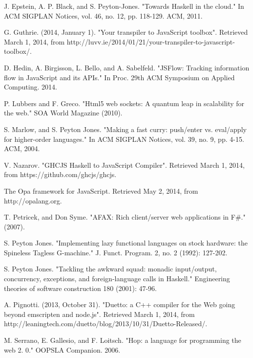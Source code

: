 \documentclass[preprint]{sigplanconf}
\begin{document}
\begin{thebibliography}{}
J. Epstein, A. P. Black, and S. Peyton-Jones. "Towards Haskell in the cloud." In ACM SIGPLAN Notices, vol. 46, no. 12, pp. 118-129. ACM, 2011.

G. Guthrie. (2014, January 1). "Your transpiler to JavaScript toolbox". Retrieved March 1, 2014, from http://luvv.ie/2014/01/21/your-transpiler-to-javascript-toolbox/.

D. Hedin, A. Birgisson, L. Bello, and A. Sabelfeld. "JSFlow: Tracking information flow in JavaScript and its APIs." In Proc. 29th ACM Symposium on Applied Computing. 2014.

P. Lubbers and F. Greco. "Html5 web sockets: A quantum leap in scalability for the web." SOA World Magazine (2010).

S. Marlow, and S. Peyton Jones. "Making a fast curry: push/enter vs. eval/apply for higher-order languages." In ACM SIGPLAN Notices, vol. 39, no. 9, pp. 4-15. ACM, 2004.

V. Nazarov. "GHCJS Haskell to JavaScript Compiler". Retrieved March 1, 2014, from https://github.com/ghcjs/ghcjs.

The Opa framework for JavaScript. Retrieved May 2, 2014, from http://opalang.org.

T. Petricek, and Don Syme. "AFAX: Rich client/server web applications in F\#." (2007).

S. Peyton Jones. "Implementing lazy functional languages on stock hardware: the Spineless Tagless G-machine." J. Funct. Program. 2, no. 2 (1992): 127-202.

S. Peyton Jones. "Tackling the awkward squad: monadic input/output, concurrency, exceptions, and foreign-language calls in Haskell." Engineering theories of software construction 180 (2001): 47-96.

A. Pignotti. (2013, October 31). "Duetto: a C++ compiler for the Web going beyond emscripten and node.js". Retrieved March 1, 2014, from http://leaningtech.com/duetto/blog/2013/10/31/Duetto-Released/.

M. Serrano, E. Gallesio, and F. Loitsch. "Hop: a language for programming the web 2. 0." OOPSLA Companion. 2006.


\end{thebibliography}
\end{document}
